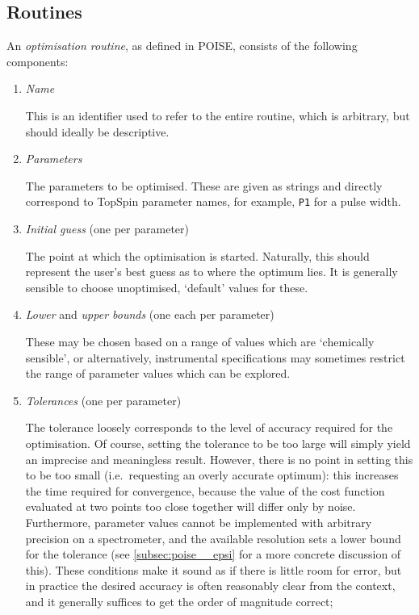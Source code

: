 \subsection{Routines}
\label{subsec:poise__routines}

An \textit{optimisation routine}, as defined in POISE, consists of the following components:

\begin{enumerate}
    \item \textit{Name}

        This is an identifier used to refer to the entire routine, which is arbitrary, but should ideally be descriptive.

    \item \textit{Parameters}

        The parameters to be optimised.
        These are given as strings and directly correspond to TopSpin parameter names, for example, \texttt{P1} for a pulse width.

    \item \textit{Initial guess} (one per parameter)

        The point at which the optimisation is started.
        Naturally, this should represent the user's best guess as to where the optimum lies.
        It is generally sensible to choose unoptimised, `default' values for these.
        
    \item \textit{Lower} and \textit{upper bounds} (one each per parameter)

        These may be chosen based on a range of values which are `chemically sensible', or alternatively, instrumental specifications may sometimes restrict the range of parameter values which can be explored.

    \item \textit{Tolerances} (one per parameter)

        The tolerance loosely corresponds to the level of accuracy required for the optimisation.
        Of course, setting the tolerance to be too large will simply yield an imprecise and meaningless result.
        However, there is no point in setting this to be too small (i.e.\ requesting an overly accurate optimum): this increases the time required for convergence, because the value of the cost function evaluated at two points too close together will differ only by noise.
        Furthermore, parameter values cannot be implemented with arbitrary precision on a spectrometer, and the available resolution sets a lower bound for the tolerance (see \cref{subsec:poise__epsi} for a more concrete discussion of this).
        These conditions make it sound as if there is little room for error, but in practice the desired accuracy is often reasonably clear from the context, and it generally suffices to get the order of magnitude correct;


\end{enumerate}
